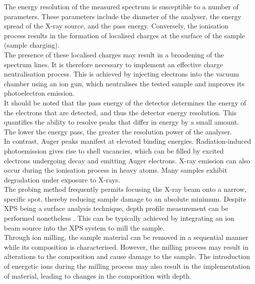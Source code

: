 \noindent The energy resolution of the measured spectrum is susceptible to a number of parameters. These parameters include the diameter of the analyser, the energy spread of the X-ray source, and the pass energy. Conversely, the ionisation process results in the formation of localised charges at the surface of the sample (sample charging). \\

\noindent The presence of these localised charges may result in a broadening of the spectrum lines. It is therefore necessary to implement an effective charge neutralisation process. This is achieved by injecting electrons into the vacuum chamber using an ion gun, which neutralises the tested sample and improves its photoelectron emission. \\

\noindent It should be noted that the pass energy of the detector determines the energy of the electrons that are detected, and thus the detector energy resolution. This quantifies the ability to resolve peaks that differ in energy by a small amount. The lower the energy pass, the greater the resolution power of the analyser.\\

\noindent In contrast, Auger peaks manifest at elevated binding energies. Radiation-induced photoemission gives rise to shell vacancies, which can be filled by excited electrons undergoing decay and emitting Auger electrons. X-ray emission can also occur during the ionisation process in heavy atoms. Many samples exhibit degradation under exposure to X-rays.\\

\noindent The probing method frequently permits focusing the X-ray beam onto a narrow, specific spot, thereby reducing sample damage to an absolute minimum. Despite XPS being a surface analysis technique, depth profile measurement can be performed nonetheless \cite{geng2002xps}. This can be typically achieved by integrating an ion beam source into the XPS system to mill the sample. \\

\noindent Through ion milling, the sample material can be removed in a sequential manner while its composition is characterised. However, the milling process may result in alterations to the composition and cause damage to the sample. The introduction of energetic ions during the milling process may also result in the implementation of material, leading to changes in the composition with depth.


